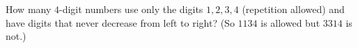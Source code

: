 How many $4$-digit numbers use only the digits $1,2,3,4$ (repetition allowed) and have digits that never decrease from left to right? (So $1134$ is allowed but $3314$ is not.)
